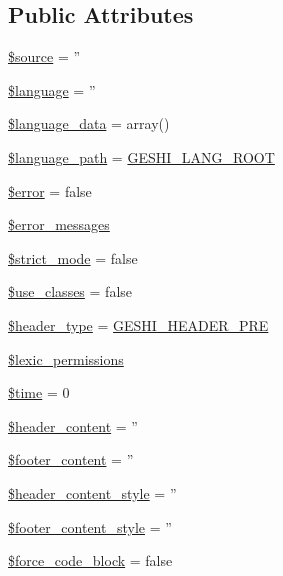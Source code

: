 \subsection*{Public Attributes}
\begin{DoxyCompactItemize}
\item 
\hyperlink{class_ge_s_hi_a1eb6a637d5335373434bd750206a6695}{\$source} = ''
\item 
\hyperlink{class_ge_s_hi_a9cd2cd4b5f31a550b7fc165d845ade76}{\$language} = ''
\item 
\hyperlink{class_ge_s_hi_a4d68083973f3b2b1ac8450f21f12474f}{\$language\-\_\-data} = array()
\item 
\hyperlink{class_ge_s_hi_a91edb12680e98dcbf0e0f660374bb6c0}{\$language\-\_\-path} = \hyperlink{geshi_8php_a9771b008486bce86bfb0f9e943d2e5dc}{G\-E\-S\-H\-I\-\_\-\-L\-A\-N\-G\-\_\-\-R\-O\-O\-T}
\item 
\hyperlink{class_ge_s_hi_a14f9678079f0bf885eb9a9a4864d4ff3}{\$error} = false
\item 
\hyperlink{class_ge_s_hi_a083d358bd822eddb0a29571fbdb0706e}{\$error\-\_\-messages}
\item 
\hyperlink{class_ge_s_hi_a6cd5db593015553b900fdfab3968b6c6}{\$strict\-\_\-mode} = false
\item 
\hyperlink{class_ge_s_hi_aac8c9944b3d19d37ed2d1f12dbe6ddc1}{\$use\-\_\-classes} = false
\item 
\hyperlink{class_ge_s_hi_a900819acce647d850e406bd86f81ca8f}{\$header\-\_\-type} = \hyperlink{geshi_8php_ae6e4b0569a0794d3a19b018f7d0a9b4c}{G\-E\-S\-H\-I\-\_\-\-H\-E\-A\-D\-E\-R\-\_\-\-P\-R\-E}
\item 
\hyperlink{class_ge_s_hi_a3f8c0387259efaf34989e0653b083051}{\$lexic\-\_\-permissions}
\item 
\hyperlink{class_ge_s_hi_a08f4ce3138dd5f72c9f157941b614a2b}{\$time} = 0
\item 
\hyperlink{class_ge_s_hi_a1b834089672ac67c4fbcbc48c81b6f50}{\$header\-\_\-content} = ''
\item 
\hyperlink{class_ge_s_hi_a0abc101255ddc2fc8ff42f2d3608567e}{\$footer\-\_\-content} = ''
\item 
\hyperlink{class_ge_s_hi_a5c7606fbd67561a99d818e63de50f8a9}{\$header\-\_\-content\-\_\-style} = ''
\item 
\hyperlink{class_ge_s_hi_a55f7570d0967eecf9a18e39cf8d981e0}{\$footer\-\_\-content\-\_\-style} = ''
\item 
\hyperlink{class_ge_s_hi_a143657164b0bd42bce03ee7f31206538}{\$force\-\_\-code\-\_\-block} = false

\end{DoxyCompactItemize}
